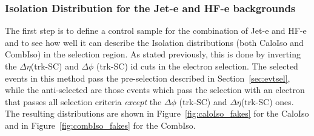 \clearpage

\subsubsection{Isolation Distribution for the Jet-e and HF-e backgrounds}

The first step is to define a control sample for the combination of Jet-e and HF-e and to see how well it can describe the Isolation distributions (both CaloIso and CombIso) in the selection region.  As stated previously, this is done by inverting the $\Delta \eta$(trk-SC) and $\Delta \phi$ (trk-SC) id cuts in the electron selection. The selected events in this method pass the pre-selection described in Section~\ref{sec:evtsel}, while the anti-selected are those events which pass the selection with an electron that passes all selection criteria {\it except} the $\Delta \phi$ (trk-SC) and $\Delta \eta$(trk-SC) ones.  The resulting distributions are shown in Figure~\ref{fig:caloIso_fakes} for the CaloIso and in Figure~\ref{fig:combIso_fakes} for the CombIso.


